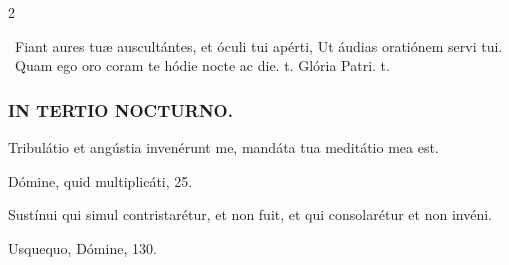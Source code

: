 \documentclass[9pt,twoside]{extarticle}
\begin{document}
\begin{multicols}{2}
\begin{tightlist}{}
\item {}~Fiant aures tuæ auscultántes, et óculi tui apérti, \textred{*} Ut áudias oratiónem servi tui. ~Quam ego oro coram te hódie nocte ac die. t. Glória Patri. t.
\end{tightlist}

\subsubsection*{\center \textsc{IN TERTIO NOCTURNO.}}
\begin{tightlist}{}
\item {} Tribulátio et angústia invenérunt me, mandáta tua meditátio mea est.
\item {} Dómine, quid multiplicáti, 25.
\end{tightlist}

%
%
%
%
%
%
%
%
%

\begin{tightlist}{}
\item {} Sustínui qui simul contristarétur, et non fuit, et qui consolarétur et non invéni.
\item {} Usquequo, Dómine, 130.
\end{tightlist}


\end{multicols}
\end{document}
